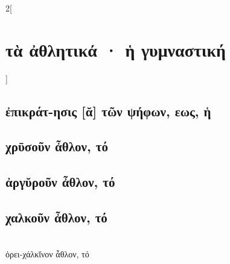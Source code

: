 \documentclass{book}
\begin{document}
\begin{multicols}{2}[\section{τὰ ἀθλητικά · ἡ γυμναστική}]
\subsection{ἐπικράτ-ησις [ᾰ] τῶν ψήφων, εως, ἡ}
\subsection{χρῡσοῦν ἆθλον, τό}
\subsection{ἀργῠροῦν ἆθλον, τό}
\subsection{χαλκοῦν ἆθλον, τό}
 ~\\
ὀρει-χάλκῐνον ἆθλον, τό
~
\end{multicols}
\newpage 
\end{document}
